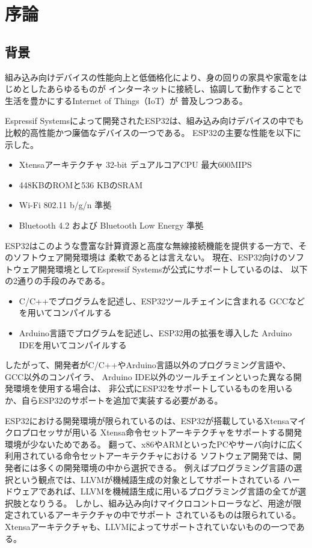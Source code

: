 \chapter{序論}
\label{chap:introduction}

\section{背景}
\label{section:background}

組み込み向けデバイスの性能向上と低価格化により、身の回りの家具や家電をはじめとしたあらゆるものが
インターネットに接続し、協調して動作することで生活を豊かにするInternet of Things（IoT）が
普及しつつある。

Espressif Systemsによって開発されたESP32\cite{esp32}は、組み込み向けデバイスの中でも
比較的高性能かつ廉価なデバイスの一つである。
ESP32の主要な性能を以下に示した。

\begin{itemize}
  \item Xtensaアーキテクチャ 32-bit デュアルコアCPU 最大600MIPS
  \item 448KBのROMと536 KBのSRAM
  \item Wi-Fi 802.11 b/g/n 準拠
  \item Bluetooth 4.2 および Bluetooth Low Energy 準拠
\end{itemize}

ESP32はこのような豊富な計算資源と高度な無線接続機能を提供する一方で、そのソフトウェア開発環境は
柔軟であるとは言えない。
現在、ESP32向けのソフトウェア開発環境としてEspressif Systemsが公式にサポートしているのは、
以下の2通りの手段のみである。

\begin{itemize}
  \item C/C++でプログラムを記述し、ESP32ツールチェイン\cite{esp_toolchain}に含まれる
        GCCなどを用いてコンパイルする
  \item Arduino言語でプログラムを記述し、ESP32用の拡張\cite{esp_arduino}を導入した
        Arduino IDE\cite{arduino_ide}を用いてコンパイルする
\end{itemize}

したがって、開発者がC/C++やArduino言語以外のプログラミング言語や、GCC以外のコンパイラ、
Arduino IDE以外のツールチェインといった異なる開発環境を使用する場合は、
非公式にESP32をサポートしているものを用いるか、自らESP32のサポートを追加で実装する必要がある。

ESP32における開発環境が限られているのは、ESP32が搭載しているXtensaマイクロプロセッサが用いる
Xtensa命令セットアーキテクチャ\cite{xtensa_isa}をサポートする開発環境が少ないためである。
翻って、x86やARMといったPCやサーバ向けに広く利用されている命令セットアーキテクチャにおける
ソフトウェア開発では、開発者には多くの開発環境の中から選択できる。
例えばプログラミング言語の選択という観点では、LLVMが機械語生成の対象としてサポートされている
ハードウェアであれば、LLVMを機械語生成に用いるプログラミング言語の全てが選択肢となりうる。
しかし、組み込み向けマイクロコントローラなど、用途が限定されているアーキテクチャの中でサポート
されているものは限られている\cite{llvm_matrix}。
Xtensaアーキテクチャも、LLVMによってサポートされていないものの一つである。

